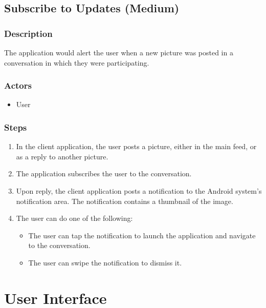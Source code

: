 \documentclass[11pt]{scrartcl}
\let\stdsection\section
\renewcommand\section{\newpage\stdsection}
\begin{document}
    \subsection{Subscribe to Updates (Medium)}
    \label{sec:subscribe}
        \subsubsection{Description}
            The application would alert the user when a new picture was posted in a conversation in which they were participating.
        \subsubsection{Actors}
            \begin{itemize}
                \item User
            \end{itemize}
        \subsubsection{Steps}
            \begin{enumerate}
                \item In the client application, the user posts a picture, either in the main feed, or as a reply to another picture.
                \item The application subscribes the user to the conversation.
                \item Upon reply, the client application posts a notification to the Android system's notification area.  The notification contains a thumbnail of the image.
                \item The user can do one of the following:
                \begin{itemize}
                    \item The user can tap the notification to launch the application and navigate to the conversation.
                    \item The user can swipe the notification to dismiss it.
                \end{itemize}
            \end{enumerate}

\appendix

\section{User Interface}
\end{document}
